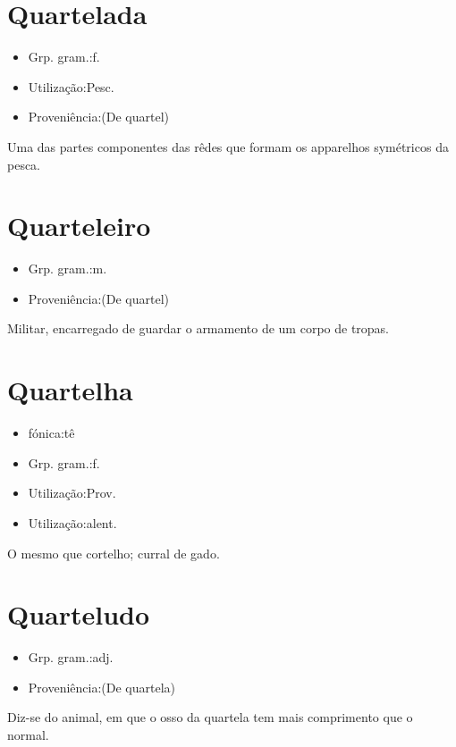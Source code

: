 \section{Quartelada}
\begin{itemize}
\item {Grp. gram.:f.}
\end{itemize}
\begin{itemize}
\item {Utilização:Pesc.}
\end{itemize}
\begin{itemize}
\item {Proveniência:(De \textunderscore quartel\textunderscore )}
\end{itemize}
Uma das partes componentes das rêdes que formam os apparelhos symétricos da pesca.
\section{Quarteleiro}
\begin{itemize}
\item {Grp. gram.:m.}
\end{itemize}
\begin{itemize}
\item {Proveniência:(De \textunderscore quartel\textunderscore )}
\end{itemize}
Militar, encarregado de guardar o armamento de um corpo de tropas.
\section{Quartelha}
\begin{itemize}
\item {fónica:tê}
\end{itemize}
\begin{itemize}
\item {Grp. gram.:f.}
\end{itemize}
\begin{itemize}
\item {Utilização:Prov.}
\end{itemize}
\begin{itemize}
\item {Utilização:alent.}
\end{itemize}
O mesmo que \textunderscore cortelho\textunderscore ; curral de gado.
\section{Quarteludo}
\begin{itemize}
\item {Grp. gram.:adj.}
\end{itemize}
\begin{itemize}
\item {Proveniência:(De \textunderscore quartela\textunderscore )}
\end{itemize}
Diz-se do animal, em que o osso da quartela tem mais comprimento que o normal.
